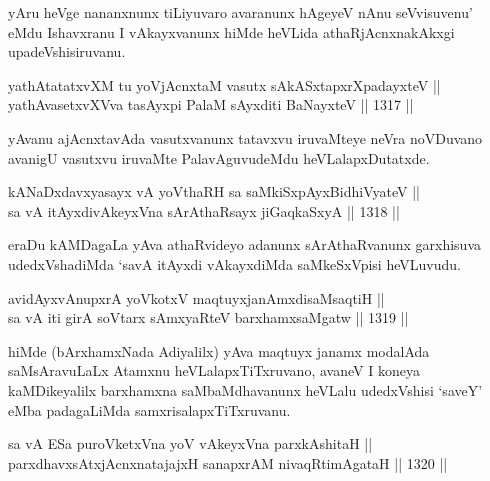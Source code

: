 \begin{artha}
yAru heVge  nananxnunx tiLiyuvaro avaranunx hAgeyeV nAnu seVvisuvenu' eMdu Ishavxranu I vAkayxvanunx hiMde heVLida athaRjAcnxnakAkxgi upadeVshisiruvanu.
\end{artha}

\begin{shl}
yathAtatatxvXM tu yoV\s jAcnxtaM vasutx sAkASxtapxrXpadayxteV ||  \\
yathAvasetxvXVva tasAyxpi PalaM  sAyxditi BaNayxteV \hfill || 1317 ||  
\end{shl}

\begin{artha}
yAvanu ajAcnxtavAda vasutxvanunx tatavxvu iruvaMteye neVra noVDuvano avanigU vasutxvu iruvaMte PalavAguvudeMdu heVLalapxDutatxde.
\end{artha}


\begin{shl}
kANaDxdavxyasayx vA yoV\s thaRH sa saMkiSxpAyxBidhiVyateV || \\
sa vA itAyxdivAkeyxVna sArAthaRsayx jiGaqkaSxyA \hfill || 1318 ||  
\end{shl}

\begin{artha}
eraDu kAMDagaLa yAva athaRvideyo adanunx sArAthaRvanunx garxhisuva udedxVshadiMda `savA itAyxdi vAkayxdiMda saMkeSxVpisi heVLuvudu.
\end{artha}


\begin{shl}
avidAyxvAnupxrA yoVkotxV maqtuyxjanAmxdisaMsaqtiH || \\
sa vA iti girA soV\s tarx sAmxyaRteV barxhamxsaMgatw \hfill || 1319 ||  
\end{shl}

\begin{artha}
hiMde (bArxhamxNada Adiyalilx) yAva maqtuyx janamx modalAda saMsAravuLaLx Atamxnu heVLalapxTiTxruvano, avaneV I koneya kaMDikeyalilx barxhamxna saMbaMdhavanunx heVLalu udedxVshisi `saveY' eMba padagaLiMda samxrisalapxTiTxruvanu.
\end{artha}


\begin{shl}
sa vA ESa puroVketxVna yoV vAkeyxVna parxkAshitaH || \\
parxdhavxsAtxjAcnxnatajajxH sanapxrAM nivaqRtimAgataH \hfill || 1320 ||  
\end{shl}

